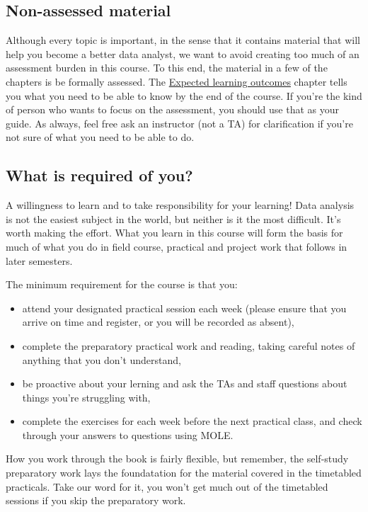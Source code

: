 \documentclass[]{book}
\begin{document}
\subsection{Non-assessed material}\label{non-assessed-material}

Although every topic is important, in the sense that it contains
material that will help you become a better data analyst, we want to
avoid creating too much of an assessment burden in this course. To this
end, the material in a few of the chapters is be formally assessed. The
\protect\hyperlink{expected-learning-outcomes}{Expected learning
outcomes} chapter tells you what you need to be able to know by the end
of the course. If you're the kind of person who wants to focus on the
assessment, you should use that as your guide. As always, feel free ask
an instructor (not a TA) for clarification if you're not sure of what
you need to be able to do.

\subsection{What is required of you?}\label{what-is-required-of-you}

A willingness to learn and to take responsibility for your learning!
Data analysis is not the easiest subject in the world, but neither is it
the most difficult. It's worth making the effort. What you learn in this
course will form the basis for much of what you do in field course,
practical and project work that follows in later semesters.

The minimum requirement for the course is that you:

\begin{itemize}
\item
  attend your designated practical session each week (please ensure that
  you arrive on time and register, or you will be recorded as absent),
\item
  complete the preparatory practical work and reading, taking careful
  notes of anything that you don't understand,
\item
  be proactive about your lerning and ask the TAs and staff questions
  about things you're struggling with,
\item
  complete the exercises for each week before the next practical class,
  and check through your answers to questions using MOLE.
\end{itemize}

How you work through the book is fairly flexible, but remember, the
self-study preparatory work lays the foundatation for the material
covered in the timetabled practicals. Take our word for it, you won't
get much out of the timetabled sessions if you skip the preparatory
work.
\end{document}
